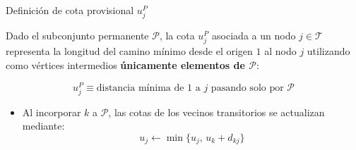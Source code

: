\documentclass[
  ignorenonframetext,
]{beamer}
\providecommand{\tightlist}{%
  \setlength{\itemsep}{0pt}\setlength{\parskip}{0pt}}
\begin{document}
\begin{frame}{Definición de cota provisional \(u_j^P\)}
\label{definiciuxf3n-de-cota-provisional-u_jp}
\begin{tcolorbox}[enhanced jigsaw, colframe=quarto-callout-note-color-frame, toptitle=1mm, colback=white, colbacktitle=quarto-callout-note-color!10!white, titlerule=0mm, breakable, coltitle=black, opacityback=0, bottomrule=.15mm, title=\textcolor{quarto-callout-note-color}{\faInfo}\hspace{0.5em}{Cota de distancia provisional}, rightrule=.15mm, arc=.35mm, leftrule=.75mm, left=2mm, toprule=.15mm, bottomtitle=1mm, opacitybacktitle=0.6]

Dado el subconjunto permanente \(\mathcal{P}\), la cota \(u_j^P\)
asociada a un nodo \(j \in \mathcal{T}\) representa la longitud del
camino mínimo desde el origen \(1\) al nodo \(j\) utilizando como
vértices intermedios \textbf{únicamente elementos de \(\mathcal{P}\)}:

\[
u_j^P \equiv \text{distancia mínima de } 1 \text{ a } j \text{ pasando solo por } \mathcal{P}
\]

\end{tcolorbox}

\begin{itemize}
\tightlist
\item
  Al incorporar \(k\) a \(\mathcal{P}\), las cotas de los vecinos
  transitorios se actualizan mediante:
  \[u_j \leftarrow \min \{ u_j, \, u_k + d_{kj} \}\]
\end{itemize}
\end{frame}
\end{document}

